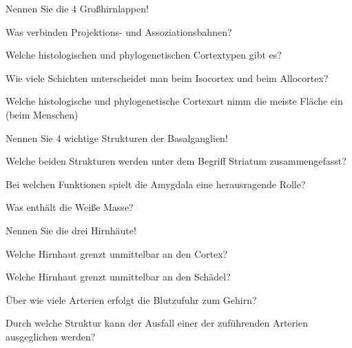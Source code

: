 \documentclass[10pt, a4paper]{exam}
\begin{document}
\begin{questions}
  \question Nennen Sie die 4 Großhirnlappen!
  \begin{solution}
  \end{solution}
  \question Was verbinden Projektions- und Assoziationsbahnen?
  \begin{solution}
  \end{solution}
  \question Welche histologischen und phylogenetischen Cortextypen gibt es?
  \begin{solution}
  \end{solution}
  \question Wie viele Schichten unterscheidet man beim Isocortex und beim Allocortex?
  \begin{solution}
  \end{solution}
  \question Welche histologische und phylogenetische Cortexart nimm die meiste Fläche ein (beim Menschen)
  \begin{solution}
  \end{solution}
  \question Nennen Sie 4 wichtige Strukturen der Basalganglien!
  \begin{solution}
  \end{solution}
  \question Welche beiden Strukturen werden unter dem Begriff Striatum zusammengefasst?
  \begin{solution}
  \end{solution}
  \question Bei welchen Funktionen spielt die Amygdala eine herausragende Rolle?
  \begin{solution}
  \end{solution}
  \question Was enthält die Weiße Masse?
  \begin{solution}
  \end{solution}
  \question Nennen Sie die drei Hirnhäute!
  \begin{solution}
  \end{solution}
  \question Welche Hirnhaut grenzt unmittelbar an den Cortex?
  \begin{solution}
  \end{solution}
  \question Welche Hirnhaut grenzt unmittelbar an den Schädel?
  \begin{solution}
  \end{solution}
  \question Über wie viele Arterien erfolgt die Blutzufuhr zum Gehirn?
  \begin{solution}
  \end{solution}
  \question Durch welche Struktur kann der Ausfall einer der zuführenden Arterien ausgeglichen werden?
  \begin{solution}
  \end{solution}

\end{questions}
\end{document}
